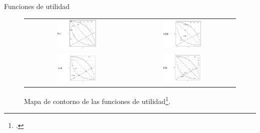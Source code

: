 \documentclass{beamer}
\begin{document}
\begin{frame}{Funciones de utilidad}
\begin{figure}[H]
\begin{tabular}{c c}
\includegraphics[width=0.4\textwidth]{ws.png}     &  \includegraphics[width=0.4\textwidth]{che.png} \\
\includegraphics[width=0.4\textwidth]{asf.png}     &  \includegraphics[width=0.4\textwidth]{pbi.png} \\
\end{tabular}
\centering
\caption{\scriptsize Mapa de contorno de las funciones de utilidad\footcite{raquel_2018}.}
\end{figure}
\end{frame}
\end{document}
